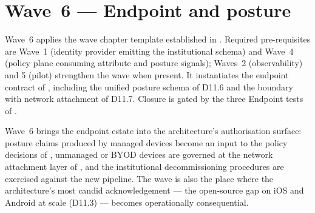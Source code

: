
\chapter{Wave~6 --- Endpoint and posture}
\label{ch:wave6-endpoint}

\begin{caveatbox}[Dependencies]
\noindent Wave~6 applies the wave chapter template established in
. Required pre-requisites are
Wave~1 (identity provider emitting the institutional schema) and
Wave~4 (policy plane consuming attribute and posture signals);
Waves~2 (observability) and 5 (pilot) strengthen the wave when
present. It instantiates the endpoint contract of
, including the unified posture schema of
D11.6 and the boundary with network attachment of D11.7. Closure
is gated by the three Endpoint tests of .
\end{caveatbox}

Wave~6 brings the endpoint estate into the architecture's
authorisation surface: posture claims produced by managed devices
become an input to the policy decisions of ,
unmanaged or BYOD devices are governed at the network attachment
layer of , and the institutional decommissioning
procedures are exercised against the new pipeline. The wave is also
the place where the architecture's most candid acknowledgement ---
the open-source gap on iOS and Android at scale (D11.3) ---
becomes operationally consequential.

